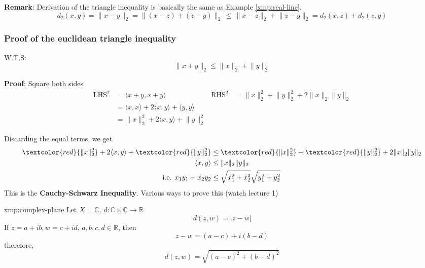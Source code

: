 \documentclass{article}
\begin{document}
\textbf{Remark}: Derivation of the triangle inequality is basically the same as Example \ref{xmp:real-line}. 
\[d_{2}(x,y) = \lVert x - y \rVert_{2} = \lVert (x-z) + (z-y) \rVert_{2} \,\le\, \lVert x-z \rVert_{2} + \lVert z-y \rVert_{2} = d_{2}(x,z) + d_{2}(z, y)\]

\subsubsection{Proof of the euclidean triangle inequality}
W.T.S: 
\[\lVert x+y \rVert_{2} \le \lVert x \rVert_{2} + \lVert y \rVert_{2}\]

\textbf{Proof}: Square both sides
\begin{align*}
    \text{LHS}^{2} &= \langle x + y, x + y \rangle  & \text{RHS}^{2}&= \lVert x \rVert^{2}_{2} + \lVert y \rVert^{2}_{2} + 2\lVert x \rVert_{2}\lVert y \rVert_{2}\\
                   &= \langle x,x \rangle + 2\langle x,y \rangle + \langle y,y \rangle \\
                   & = \lVert x \rVert^{2}_{2} + 2\langle x,y \rangle + \lVert y \rVert^{2}_{2}
\end{align*}
\newpage

Discarding the equal terms, we get
\begin{align*}
    \textcolor{red}{\lVert x \rVert^{2}_{2}} + 2\langle x,y \rangle + \textcolor{red}{\lVert y \rVert^{2}_{2}} &\le \textcolor{red}{\lVert x \rVert^{2}_{2}} + \textcolor{red}{\lVert y \rVert^{2}_{2}} + 2\lVert x \rVert_{2}\lVert y \rVert_{2}\\
    \langle x,y \rangle &\le \lVert x \rVert_{2}\lVert y \rVert_{2} \\
    \text{i.e. } x_{1}y_{1} + x_{2}y_{2} &\le \sqrt{x^{2}_{1} + x^{2}_{2}}\sqrt{y^{2}_{1}+y^{2}_{2}}
\end{align*}
This is the \textbf{Cauchy-Schwarz Inequality}. Various ways to prove this (watch lecture 1)

\begin{xmp}{xmp:complex-plane}{}
    Let $X = \mathbb{C},\, d: \mathbb{C} \times \mathbb{C} \to \mathbb{R} $
    \[d(z,w) = \lvert z - w \rvert\]
    If $z = a+ib, w = c+id,\, a,b,c,d\in\mathbb{R}$, then
    \[z - w = (a - c) + i(b - d)\]
    therefore,
    \[d(z,w) = \sqrt{(a-c)^{2} + (b-d)^{2}}\]
\end{xmp}
\end{document}

